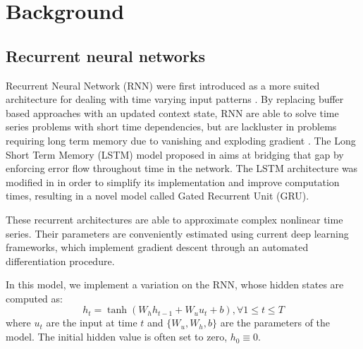 \documentclass{article}
\begin{document}
\section{Background}
\label{sec:background}

\subsection{Recurrent neural networks}
\label{sec:background:rnn}
Recurrent Neural Network (RNN) were first introduced as a more suited architecture for dealing with time varying input patterns \cite{Mozer1989AFB}.
By replacing buffer based approaches with an updated context state, RNN are able to solve time series problems with short time dependencies, but are lackluster in problems requiring long term memory due to vanishing and exploding gradient \cite{Bengio1994LearningLD}.
The Long Short Term Memory (LSTM) model proposed in \cite{Hochreiter1997LongSM} aims at bridging that gap by enforcing error flow throughout time in the network.
The LSTM architecture was modified in \cite{Cho2014LearningPR} in order to simplify its implementation and improve computation times, resulting in a novel model called Gated Recurrent Unit (GRU).

These recurrent architectures are able to approximate complex nonlinear time series.
Their parameters are conveniently estimated using current deep learning frameworks, which implement gradient descent through an automated differentiation procedure.

In this model, we implement a variation on the RNN, whose hidden states are computed as:
$$
	h_t = \tanh(W_h h_{t-1} + W_u u_t + b), \forall 1 \leq t \leq T
$$
where $u_t$ are the input at time $t$ and $\{W_u, W_h, b\}$ are the parameters of the model. The initial hidden value is often set to zero, $h_0 \equiv 0$.
\end{document}
